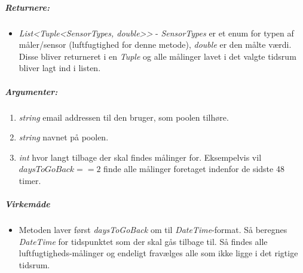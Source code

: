 \subparagraph{Returnere:}
\begin{itemize}
	\item \textit{List<Tuple<SensorTypes, double>>} - \textit{SensorTypes} er et enum for typen af måler/sensor (luftfugtighed for denne metode), \textit{double} er den målte værdi. Disse bliver returneret i en \textit{Tuple} og alle målinger lavet i det valgte tidsrum bliver lagt ind i listen.
\end{itemize}

\subparagraph{Argumenter:}
\begin{enumerate}
	\item \textit{string} email addressen til den bruger, som poolen tilhøre.
	\item \textit{string} navnet på poolen.
	\item \textit{int} hvor langt tilbage der skal findes målinger for. Eksempelvis vil $daysToGoBack == 2$ finde alle målinger foretaget indenfor de sidste 48 timer.
\end{enumerate}

\subparagraph{Virkemåde}
\begin{itemize}
	\item Metoden laver først \textit{daysToGoBack} om til \textit{DateTime}-format. Så beregnes \textit{DateTime} for tidspunktet som der skal gås tilbage til. Så findes alle luftfugtigheds-målinger og endeligt fravælges alle som ikke ligge i det rigtige tidsrum.
\end{itemize}







